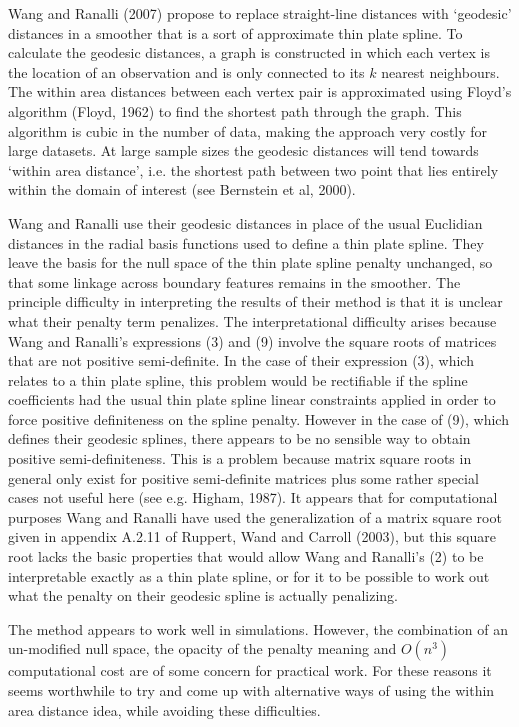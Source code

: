 \documentclass[useAMS, referee]{biom}
\begin{document}
Wang and Ranalli (2007) propose to replace straight-line distances with `geodesic' distances in a smoother that is a sort of approximate thin plate spline. To calculate the geodesic distances, a graph is constructed in which each vertex is the location of an observation and is only connected to its $k$ nearest neighbours. The within area distances between each vertex pair is approximated using  Floyd's algorithm (Floyd, 1962) to find the shortest path through the graph. This algorithm is cubic in the number of data, making the approach very costly for large datasets. At large sample sizes the geodesic distances will tend towards `within area distance', i.e. the shortest path between two point that lies entirely within the domain of interest (see Bernstein et al, 2000). 

Wang and Ranalli use their geodesic distances in place of the usual Euclidian distances in the radial basis functions used to define a thin plate spline. They leave the basis for the null space of the thin plate spline penalty unchanged, so that some linkage across boundary features remains in the smoother. The principle difficulty in interpreting the results of their method is that it is unclear what their penalty term penalizes. The interpretational difficulty arises because  Wang and Ranalli's expressions (3) and (9) involve the square roots of matrices that are not positive semi-definite. In the case of their expression (3), which relates to a thin plate spline, this problem would be rectifiable if the spline coefficients had the usual thin plate spline linear constraints applied in order to force positive definiteness on the spline penalty. However in the case of (9), which defines their geodesic splines, there appears to be no sensible way to obtain positive semi-definiteness. This is a problem because matrix square roots in general only exist for positive semi-definite matrices plus some rather special cases not useful here (see e.g. Higham, 1987). It appears that for computational purposes Wang and Ranalli have used the generalization of a matrix square root given in appendix A.2.11 of Ruppert, Wand and Carroll (2003), but this square root lacks the basic properties that would allow Wang and Ranalli's (2) to be interpretable exactly as a thin plate spline, or for it to be possible to work out what the penalty on their geodesic spline is actually penalizing. 

The method appears to work well in simulations. However, the combination of an un-modified null space, the opacity of the penalty meaning and $O(n^3)$ computational cost are of some concern for practical work. For these reasons it seems worthwhile to try and come up with alternative ways of using the within area distance idea, while avoiding these difficulties. 
\end{document}
